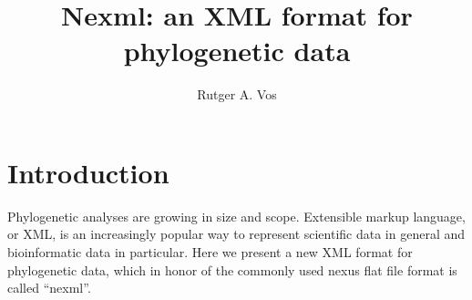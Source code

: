 \documentclass{article}
\author{Rutger A. Vos}
\title{Nexml: an XML format for phylogenetic data}
\begin{document}
\maketitle \tableofcontents

\section{Introduction} Phylogenetic analyses are growing in size and
scope. Extensible markup language, or XML\cite{citeulike:2580222}, is an
increasingly popular way to represent scientific data in general
\cite{citeulike:1937046} and bioinformatic data \cite{citeulike:242} in
particular. Here we present a new XML format for phylogenetic data,
which in honor of the commonly used nexus \cite{citeulike:2011773} flat
file format is called ``nexml''.

\end{document}
